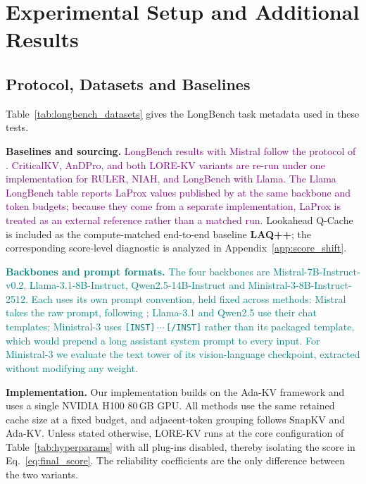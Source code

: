 \documentclass{article} %
\begin{document}
\section{Experimental Setup and Additional Results}
\label{app:experimental_details}

\subsection{Protocol, Datasets and Baselines}\label{app:datasets}

Table~\ref{tab:longbench_datasets} gives the LongBench task metadata
used in these tests.

\textbf{Baselines and sourcing.}
\textcolor{purple}{LongBench results with Mistral follow the protocol of \citet{geng2026accurate}. CriticalKV, AnDPro, and both LORE-KV variants are re-run under one implementation for RULER, NIAH, and LongBench with Llama. The Llama LongBench table reports LaProx values published by \citet{mai2026reformulating} at the same backbone and token budgets; because they come from a separate implementation, LaProx is treated as an external reference rather than a matched run.} Lookahead Q-Cache \citep{wang2025lookahead} is included as the compute-matched end-to-end baseline \textbf{LAQ++}; the corresponding score-level diagnostic is analyzed in Appendix~\ref{app:score_shift}.

\textcolor{teal}{\textbf{Backbones and prompt formats.} The four backbones are Mistral-7B-Instruct-v0.2, Llama-3.1-8B-Instruct, Qwen2.5-14B-Instruct and Ministral-3-8B-Instruct-2512. Each uses its own prompt convention, held fixed across methods: Mistral takes the raw prompt, following \citet{geng2026accurate}; Llama-3.1 and Qwen2.5 use their chat templates; Ministral-3 uses \texttt{[INST]}\,$\cdots$\,\texttt{[/INST]} rather than its packaged template, which would prepend a long assistant system prompt to every input. For Ministral-3 we evaluate the text tower of its vision-language checkpoint, extracted without modifying any weight.}

\textbf{Implementation.}
Our implementation builds on the Ada-KV framework and uses a single NVIDIA H100 80\,GB GPU. All methods use the same retained cache size at a fixed budget, and adjacent-token grouping follows SnapKV and Ada-KV. Unless stated otherwise, LORE-KV runs at the core configuration of Table~\ref{tab:hyperparams} with all plug-ins disabled, thereby isolating the score in Eq.~\ref{eq:final_score}. The reliability coefficients are the only difference between the two variants.
\end{document}
